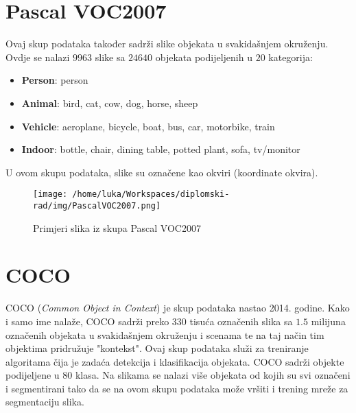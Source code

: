 \section{Pascal VOC2007}

Ovaj skup podataka \citep{pascal-voc-2007} također sadrži slike objekata u svakidašnjem okruženju. Ovdje se nalazi $9963$ slike sa $24 640$ objekata podijeljenih u $20$ kategorija:
\begin{itemize}
	\item \textbf{Person}: person
    \item \textbf{Animal}: bird, cat, cow, dog, horse, sheep
    \item \textbf{Vehicle}: aeroplane, bicycle, boat, bus, car, motorbike, train
    \item \textbf{Indoor}: bottle, chair, dining table, potted plant, sofa, tv/monitor
\end{itemize}
U ovom skupu podataka, slike su označene kao okviri (koordinate okvira).

\begin{figure}[h]
	\centering
	\texttt{[image: /home/luka/Workspaces/diplomski-rad/img/PascalVOC2007.png]}
	\caption{Primjeri slika iz skupa Pascal VOC2007}
	\label{img:pascalVOC2007}
\end{figure}

\section{COCO}

COCO (\textit{Common Object in Context}) \citep{coco} je skup podataka nastao 2014. godine. Kako i samo ime nalaže, COCO sadrži preko $330$ tisuća označenih slika sa $1.5$ milijuna označenih objekata u svakidašnjem okruženju i scenama te na taj način tim objektima pridružuje "kontekst". Ovaj skup podataka služi za treniranje algoritama čija je zadaća detekcija i klasifikacija objekata. COCO sadrži objekte podijeljene u $80$ klasa. Na slikama se nalazi više objekata od kojih su svi označeni i segmentirani tako da se na ovom skupu podataka može vršiti i trening mreže za segmentaciju slika. 

